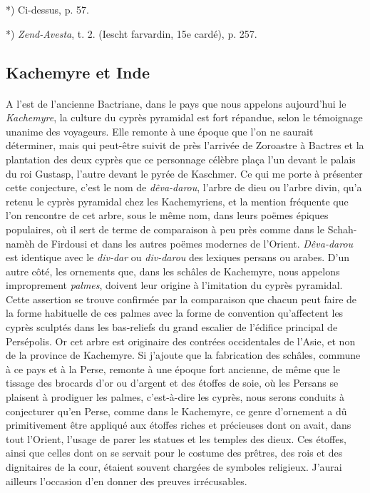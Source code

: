 \documentclass[a4paper, 11pt, oneside, polutonikogreek, french]{article}
\begin{document}
*) Ci-dessus, p. 57.

*) \emph{Zend-Avesta}, t. 2. (Iescht farvardin, 15e cardé), p. 257.
\clearpage
\subsection{Kachemyre et Inde}
\paragraph{}
A l'est de l'ancienne Bactriane, dans le pays que nous appelons aujourd'hui le \emph{Kachemyre}, la culture du cyprès pyramidal est fort répandue, selon le témoignage unanime des voyageurs. Elle remonte à une époque que l'on ne saurait déterminer, mais qui peut-être suivit de près l'arrivée de Zoroastre à Bactres et la plantation des deux cyprès que ce personnage célèbre plaça l'un devant le palais du roi Gustasp, l'autre devant le pyrée de Kaschmer. Ce qui me porte à présenter cette conjecture, c'est le nom de \emph{dêva-darou}, l'arbre de dieu ou l'arbre divin, qu'a retenu le cyprès pyramidal chez les Kachemyriens, et la mention fréquente que l'on rencontre de cet arbre, sous le même nom, dans leurs poëmes épiques populaires, où il sert de terme de comparaison à peu près comme dans le Schah-namèh de Firdousi et dans les autres poëmes modernes de l'Orient. \emph{Dêva-darou} est identique avec le \emph{div-dar} ou \emph{div-darou} des lexiques persans ou arabes. D'un autre côté, les ornements que, dans les schâles de Kachemyre, nous appelons improprement \emph{palmes}, doivent leur origine à l'imitation du cyprès pyramidal. Cette assertion se trouve confirmée par la comparaison que chacun peut faire de la forme habituelle de ces palmes avec la forme de convention qu'affectent les cyprès sculptés dans les bas-reliefs du grand escalier de l'édifice principal de Persépolis. Or cet arbre est originaire des contrées occidentales de l'Asie, et non de la province de Kachemyre. Si j'ajoute que la fabrication des schâles, commune à ce pays et à la Perse, remonte à une époque fort ancienne, de même que le tissage des brocards d'or ou d'argent et des étoffes de soie, où les Persans se plaisent à prodiguer les palmes, c'est-à-dire les cyprès, nous serons conduits à conjecturer qu'en Perse, comme dans le Kachemyre, ce genre d'ornement a dû primitivement être appliqué aux étoffes riches et précieuses dont on avait, dans tout l'Orient, l'usage de parer les statues et les temples des dieux. Ces étoffes, ainsi que celles dont on se servait pour le costume des prêtres, des rois et des dignitaires de la cour, étaient souvent chargées de symboles religieux. J'aurai ailleurs l'occasion d'en donner des preuves irrécusables.
\end{document}
